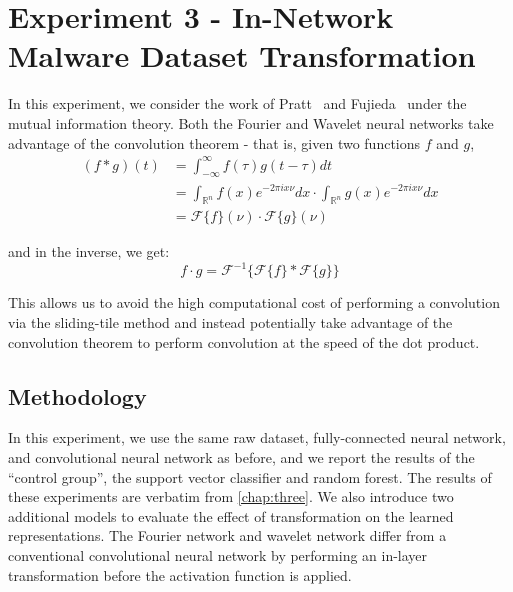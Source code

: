 \chapter{Experiment 3 - In-Network Malware Dataset Transformation}
\label{chap:four}

In this experiment, we consider the work of Pratt~\cite{pratt2017fcnn} and Fujieda~\cite{fujieda2017wavelet} under the mutual information theory.
Both the Fourier and Wavelet neural networks take advantage of the convolution theorem - that is, given two functions $f$ and $g$,
\begin{align}
(f * g)(t) & = \int_{-\infty}^{\infty} f(\tau)g(t-\tau)dt \\
& = \int_{\mathbb{R}^n}f(x) e^{-2\pi i x \nu} dx	 \cdot \int_{\mathbb{R}^n}g(x) e^{-2\pi i x \nu} dx\\	
& = \mathcal{F}\{f\}(\nu) \cdot \mathcal{F}\{g\}(\nu)
\end{align}

and in the inverse, we get:
$$f \cdot g = \mathcal{F}^{-1}\{\mathcal{F}\{f\} * \mathcal{F}\{g\}\}$$

This allows us to avoid the high computational cost of performing a convolution via the sliding-tile method and instead potentially take advantage of the convolution theorem to perform convolution at the speed of the dot product.

\section{Methodology}
In this experiment, we use the same raw dataset, fully-connected neural network, and convolutional neural network as before, and we report the results of the ``control group'', the support vector classifier and random forest.
The results of these experiments are verbatim from \ref{chap:three}.
We also introduce two additional models to evaluate the effect of transformation on the learned representations.
The Fourier network and wavelet network differ from a conventional convolutional neural network by performing an in-layer transformation before the activation function is applied. 

